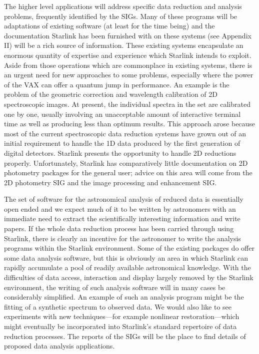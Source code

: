 The higher level applications will address specific data reduction and analysis
problems, frequently identified by the SIGs.
Many of these programs will be adaptations of existing software (at least for
the time being) and the documentation Starlink has been furnished with on these
systems (see Appendix II) will be a rich source of information.
These existing systems encapsulate an enormous quantity of expertise and
experience which Starlink intends to exploit.
Aside from those operations which are commonplace in existing systems, there is
an urgent need for new approaches to some problems, especially where the power
of the VAX can offer a quantum jump in performance.
An example is the problem of the geometric correction and wavelength calibration
of 2D spectroscopic images.
At present, the individual spectra in the set are calibrated one by one,
usually involving an unacceptable amount of interactive terminal time as well
as producing less than optimum results.
This approach arose because most of the current spectroscopic data reduction
systems have grown out of an initial requirement to handle the 1D data produced
by the first generation of digital detectors.
Starlink presents the opportunity to handle 2D reductions properly.
Unfortunately, Starlink has comparatively little documentation on 2D photometry
packages for the general user; advice on this area will come from the 2D
photometry SIG and the image processing and enhancement SIG.

The set of software for the astronomical analysis of reduced data is essentially
open ended and we expect much of it to be written by astronomers with an
immediate need to extract the scientifically interesting information and write
papers.
If the whole data reduction process has been carried through using Starlink,
there is clearly an incentive for the astronomer to write the analysis programs
within the Starlink environment.
Some of the existing packages do offer some data analysis software, but this is
obviously an area in which Starlink can rapidly accumulate a pool of readily
available astronomical knowledge.
With the difficulties of data access, interaction and display largely removed
by the Starlink environment, the writing of such analysis software will in many
cases be considerably simplified.
An example of such an analysis program might be the fitting of a synthetic
spectrum to observed data.
We would also like to see experiments with new techniques---for example
nonlinear restoration---which might eventually be incorporated into Starlink's
standard repertoire of data reduction processes.
The reports of the SIGs will be the place to find details of proposed data
analysis applications.

